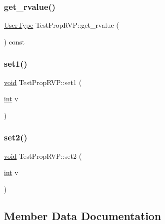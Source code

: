 \subsubsection{\texorpdfstring{get\_rvalue()}{get\_rvalue()}}
{\footnotesize\ttfamily \mbox{\hyperlink{class_user_type}{User\+Type}} Test\+Prop\+R\+V\+P\+::get\+\_\+rvalue (\begin{DoxyParamCaption}{ }\end{DoxyParamCaption}) const\hspace{0.3cm}{\ttfamily [inline]}}

\mbox{\label{struct_test_prop_r_v_p_a6543c13c527d505b9fd2501f0a5ab448}} 
\subsubsection{\texorpdfstring{set1()}{set1()}}
{\footnotesize\ttfamily \mbox{\hyperlink{_s_d_l__opengles2__gl2ext_8h_ae5d8fa23ad07c48bb609509eae494c95}{void}} Test\+Prop\+R\+V\+P\+::set1 (\begin{DoxyParamCaption}\item[{\mbox{\hyperlink{warnings_8h_a74f207b5aa4ba51c3a2ad59b219a423b}{int}}}]{v }\end{DoxyParamCaption})\hspace{0.3cm}{\ttfamily [inline]}}

\mbox{\label{struct_test_prop_r_v_p_a35fccfb9120260be4c290f6fd5884770}} 
\subsubsection{\texorpdfstring{set2()}{set2()}}
{\footnotesize\ttfamily \mbox{\hyperlink{_s_d_l__opengles2__gl2ext_8h_ae5d8fa23ad07c48bb609509eae494c95}{void}} Test\+Prop\+R\+V\+P\+::set2 (\begin{DoxyParamCaption}\item[{\mbox{\hyperlink{warnings_8h_a74f207b5aa4ba51c3a2ad59b219a423b}{int}}}]{v }\end{DoxyParamCaption})\hspace{0.3cm}{\ttfamily [inline]}}



\subsection{Member Data Documentation}
\mbox{\label{struct_test_prop_r_v_p_a716e71ef0663c4f55cb6a6664e876eaf}} 
